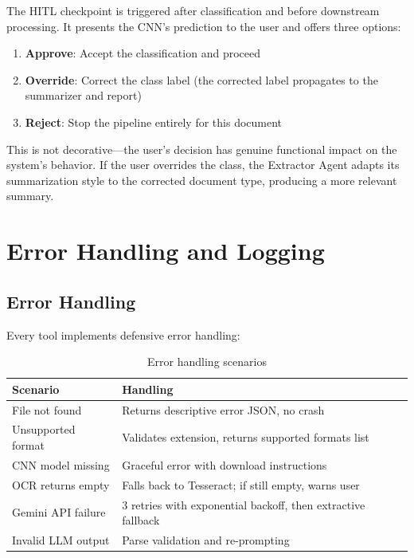 \documentclass[12pt,a4paper]{article}
\begin{document}
The HITL checkpoint is triggered after classification and before downstream processing. It presents the CNN's prediction to the user and offers three options:

\begin{enumerate}
    \item \textbf{Approve}: Accept the classification and proceed
    \item \textbf{Override}: Correct the class label (the corrected label propagates to the summarizer and report)
    \item \textbf{Reject}: Stop the pipeline entirely for this document
\end{enumerate}

This is not decorative---the user's decision has genuine functional impact on the system's behavior. If the user overrides the class, the Extractor Agent adapts its summarization style to the corrected document type, producing a more relevant summary.

\section{Error Handling and Logging}

\subsection{Error Handling}
Every tool implements defensive error handling:

\begin{table}[H]
\centering
\caption{Error handling scenarios}
\begin{tabular}{@{}lp{7cm}@{}}
\toprule
\textbf{Scenario} & \textbf{Handling} \\
\midrule
File not found & Returns descriptive error JSON, no crash \\
Unsupported format & Validates extension, returns supported formats list \\
CNN model missing & Graceful error with download instructions \\
OCR returns empty & Falls back to Tesseract; if still empty, warns user \\
Gemini API failure & 3 retries with exponential backoff, then extractive fallback \\
Invalid LLM output & Parse validation and re-prompting \\
\bottomrule
\end{tabular}
\end{table}
\end{document}
